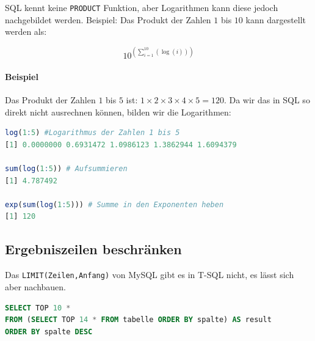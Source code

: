 \documentclass[12pt,ngerman,a4paper,index=totoc,twoside]{scrartcl}
\newcommand{\sql}[1]{\texttt{#1}}
\newcommand{\lwidth}{0.75}
\begin{document}
SQL kennt keine \sql{PRODUCT} Funktion, aber Logarithmen kann diese jedoch nachgebildet werden. Beispiel: Das Produkt der Zahlen $1$ bis $10$ kann dargestellt werden als:

\[10^{\left(\sum_{i=1}^{10}(\log(i))\right)}\]

\paragraph{Beispiel}

Das Produkt der Zahlen $1$ bis $5$ ist: $1\times2\times3\times4\times5=120$. Da wir das in SQL so direkt nicht ausrechnen können, bilden wir die Logarithmen:


\begin{center}
\begin{minipage}{\lwidth\textwidth}
\begin{lstlisting}[language={R},caption={Rechenbeispiel in R (\url{http://r-project.org})},label={r:product}]
log(1:5) #Logarithmus der Zahlen 1 bis 5
[1] 0.0000000 0.6931472 1.0986123 1.3862944 1.6094379

sum(log(1:5)) # Aufsummieren
[1] 4.787492

exp(sum(log(1:5))) # Summe in den Exponenten heben
[1] 120
\end{lstlisting}
\end{minipage}
\end{center}






\subsection{Ergebniszeilen beschränken}\label{top1}

Das \sql{LIMIT(Zeilen,Anfang)} von MySQL gibt es in T-SQL nicht, es lässt sich aber nachbauen. 

\begin{center}
\begin{minipage}{\lwidth\textwidth}
\begin{lstlisting}[language={SQL},caption={\sql{SELECT} Abfrage um die Ergebniszeilen 5 bis 10 eines Resultsets zu erhalten},label={tricks:top1}]
SELECT TOP 10 *
FROM (SELECT TOP 14 * FROM tabelle ORDER BY spalte) AS result
ORDER BY spalte DESC
\end{lstlisting}
\end{minipage}
\end{center}
\end{document}
